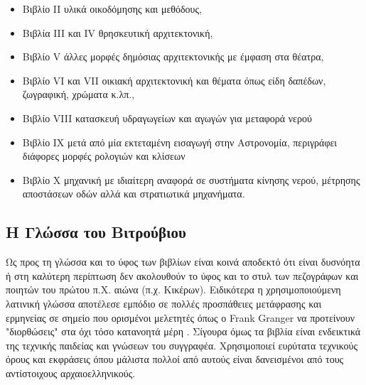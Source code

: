 \begin{itemize}[noitemsep]
\item Βιβλίο II υλικά οικοδόμησης και μεθόδους,
\item Βιβλία III και IV θρησκευτική αρχιτεκτονική,
\item Βιβλίο V άλλες μορφές δημόσιας αρχιτεκτονικής με έμφαση στα θέατρα,
\item Βιβλίο VI και VII οικιακή αρχιτεκτονική και θέματα όπως είδη δαπέδων, ζωγραφική, χρώματα κ.λπ.,
\item Βιβλίο VIII κατασκευή υδραγωγείων και αγωγών για μεταφορά νερού
\item Βιβλίο IX μετά από μία εκτεταμένη εισαγωγή στην Αστρονομία, περιγράφει διάφορες μορφές ρολογιών και κλίσεων
\item Βιβλίο X μηχανική με ιδιαίτερη αναφορά σε συστήματα κίνησης νερού, μέτρησης αποστάσεων οδών αλλά και στρατιωτικά μηχανήματα.
\end{itemize}

\subsection{Η Γλώσσα του Βιτρούβιου}

Ως προς τη γλώσσα και το ύφος των βιβλίων είναι κοινά αποδεκτό ότι είναι δυσνόητα ή στη καλύτερη περίπτωση δεν ακολουθούν το ύφος και το στυλ των πεζογράφων και ποιητών του πρώτου π.Χ. αιώνα (π.χ. Κικέρων). Ειδικότερα η χρησιμοποιούμενη λατινική γλώσσα αποτέλεσε εμπόδιο σε πολλές προσπάθειες μετάφρασης και ερμηνείας σε σημείο που ορισμένοι μελετητές όπως ο Frank Granger να προτείνουν "διορθώσεις" στα όχι τόσο κατανοητά μέρη  \cite[σ. 19]{vitruvius-lefas}. Σίγουρα όμως τα βιβλία είναι ενδεικτικά της τεχνικής παιδείας και γνώσεων του συγγραφέα. Χρησιμοποιεί ευρύτατα τεχνικούς όρους και εκφράσεις όπου μάλιστα πολλοί από αυτούς είναι δανεισμένοι από τους αντίστοιχους αρχαιοελληνικούς.







